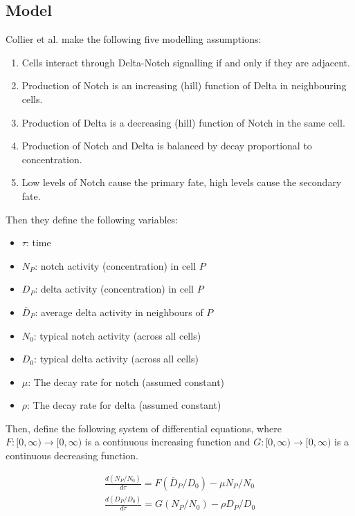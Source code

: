 \documentclass{article}
\begin{document}
\begin{flushleft}
\subsection{Model}

Collier et al. make the following five modelling assumptions:
\begin{enumerate}
  \item Cells interact through Delta-Notch signalling if and only if they are adjacent.
  \item Production of Notch is an increasing (hill) function of Delta in neighbouring cells.
  \item Production of Delta is a decreasing (hill) function of Notch in the same cell.
  \item Production of Notch and Delta is balanced by decay proportional to concentration.
  \item Low levels of Notch cause the primary fate, high levels cause the secondary fate.
\end{enumerate}

Then they define the following variables:

\begin{itemize}
  \item $\tau$: time
  \item $N_{P}$: notch activity (concentration) in cell $P$
  \item $D_{P}$: delta activity (concentration) in cell $P$
  \item $\overline{D}_{P}$: average delta activity in neighbours of $P$
  \item $N_{0}$: typical notch activity (across all cells)
  \item $D_{0}$: typical delta activity (across all cells)
  \item $\mu$: The decay rate for notch (assumed constant)
  \item $\rho$: The decay rate for delta (assumed constant)
\end{itemize}

Then, define the following system of differential equations, where $F:[0, \infty) \rightarrow [0, \infty)$ is a continuous increasing function and $G: [0, \infty)\rightarrow [0, \infty)$ is a continuous decreasing function.

$$
\begin{aligned}
  \frac{d(N_{P} / N_{0})}{d\tau} = F(\overline{D}_{P} / D_{0}) - \mu N_{P} / N_{0} \\[5pt]
  \frac{d(D_{P} / D_{0})}{d\tau} = G(N_{P} / N_{0}) - \rho D_{P} / D_{0}
\end{aligned}
$$


\end{flushleft}
\end{document}
